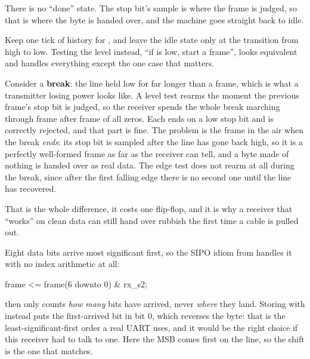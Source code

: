 There is no ``done'' state. The stop bit's sample is where the frame is judged, so that is where the
byte is handed over, and the machine goes straight back to idle.

Keep one tick of history for , and leave the idle state only at the transition from high
to low. Testing the level instead, ``if  is low, start a frame'', looks equivalent and
handles everything except the one case that matters.

Consider a \textbf{break}: the line held low for far longer than a frame, which is what a transmitter
losing power looks like. A level test rearms the moment the previous frame's stop bit is judged, so
the receiver spends the whole break marching through frame after frame of all zeros. Each ends on a
low stop bit and is correctly rejected, and that part is fine. The problem is the frame in the air
when the break \emph{ends}: its stop bit is sampled after the line has gone back high, so it is a
perfectly well-formed frame as far as the receiver can tell, and a byte made of nothing is handed
over as real data. The edge test does not rearm at all during the break, since after the first
falling edge there is no second one until the line has recovered.

That is the whole difference, it costs one flip-flop, and it is why a receiver that ``works'' on
clean data can still hand over rubbish the first time a cable is pulled out.

Eight data bits arrive most significant first, so the SIPO idiom from  handles it
with no index arithmetic at all:

\begin{vhdlcode}
frame <= frame(6 downto 0) & rx_s2;
\end{vhdlcode}

 then only counts \emph{how many} bits have arrived, never \emph{where} they land.
Storing with  instead puts the first-arrived bit in bit 0, which
reverses the byte: that is the least-significant-first order a real UART uses, and it would be the
right choice if this receiver had to talk to one. Here the MSB comes first on the line, so the shift
is the one that matches.

